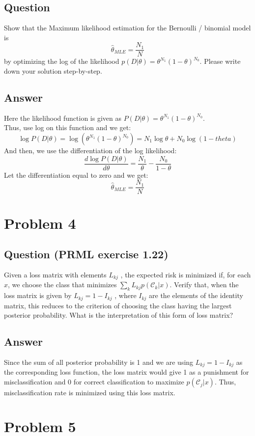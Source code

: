 \documentclass[11pt, oneside]{article}
\begin{document}
\subsection{Question}
Show that the Maximum likelihood estimation for the Bernoulli / binomial model is
$$\hat{\theta}_{MLE} = \frac{N_1}{N}$$
by optimizing the log of the likelihood $p(D|\theta)= \theta^{N_1}(1-\theta)^{N_0}$. Please write down your solution step-by-step.
\subsection{Answer}
Here the likelihood function is given as $P(D|\theta) = \theta^{N_1}(1-\theta)^{N_0}$.\\
Thus, use log on this function and we get:
$$\log{P(D|\theta)} = \log{(\theta^{N_1}(1-\theta)^{N_0})}=N_1\log{\theta}+N_0\log{(1-theta)}$$
And then, we use the differentiation of the log likelihood:
$$\frac{d\log{P(D|\theta)}}{d\theta}=\frac{N_1}{\theta}-\frac{N_0}{1-\theta}$$
Let the differentiation equal to zero and we get:
$$\hat{\theta}_{MLE} = \frac{N_1}{N}$$

\section{Problem 4}
\subsection{Question (PRML exercise 1.22)}
Given a loss matrix with elements $L_{kj}$ , the expected risk is minimized if, for each $x$, we choose the class that minimizes $\sum_k{L_{kj}p(\mathcal{C}_k|x)}$. Verify that, when the loss matrix is given by $L_{kj} = 1-I_{kj}$ , where $I_{kj}$ are the elements of the identity matrix, this reduces to the criterion of choosing the class having the largest posterior probability. What is the interpretation of this form of loss matrix?
\subsection{Answer}
Since the sum of all posterior probability is 1 and we are using $L_{kj} = 1-I_{kj}$ as the corresponding loss function, the loss matrix would give 1 as a punishment for misclassification and 0 for correct classification to maximize $p(\mathcal{C}_j|x)$. Thus, misclassification rate is minimized using this loss matrix.

\section{Problem 5}
\end{document}
